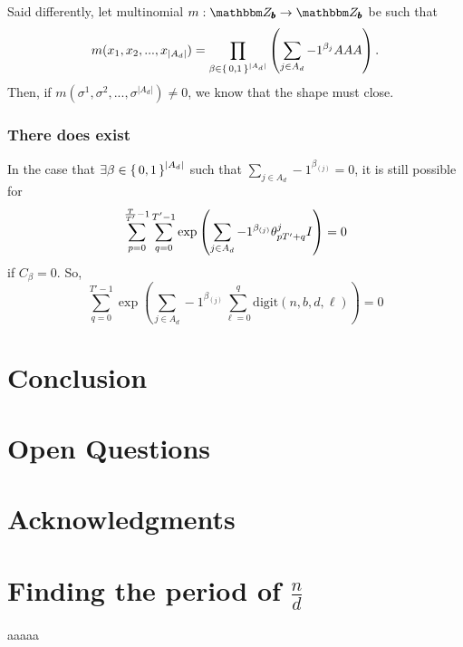 \documentclass[11pt,titlepage]{article}
\newcommand{\rationalPeriodTotal}{{T}'}
\newcommand{\digSumPeriodicNoJ}{{\sigma}}
\newcommand{\commonBase}{\pmb{b}}
\begin{document}
Said differently, let multinomial $m: \Z_{\commonBase} \rightarrow \Z_{\commonBase}$ be such that
\begin{equation*}
  m(x_1, x_2, ..., x_{|A_d|}) = \prod_{\beta \in \set{0, 1}^{|A_d|}} \left(\sum_{j \in A_d} -1^{\beta_j}AAA \right).
\end{equation*}
Then, if $m(\digSumPeriodicNoJ^1, \digSumPeriodicNoJ^2, ..., \digSumPeriodicNoJ^{|A_d|}) \neq 0$,
we know that the shape must close.


\subsubsection*{There does exist}

In the case that $\exists \beta \in \set{0, 1}^{|A_d|}$ such that $\sum_{j \in A_d} -1 ^ {\beta_{(j)}} = 0$, it is still possible
for
$$
\eqWTSInnerProd = 0
$$
if $C_\beta = 0$. So, 
\begin{equation*}
  \sum_{q = 0}^{\rationalPeriodTotal - 1}
  \exp\left(
      \sum_{j \in A_d} -1 ^ {\beta_{(j)}}
        \sum_{\ell = 0}^{q}\mathrm{digit}(n, b, d, \ell)
  \right) = 0
\end{equation*}






\section{Conclusion}

\section{Open Questions}


\section*{Acknowledgments}


\appendix
\section{Finding the period of $\frac{n}{d}$}
\label{AppendixPeriod}
aaaaa



\end{document}
